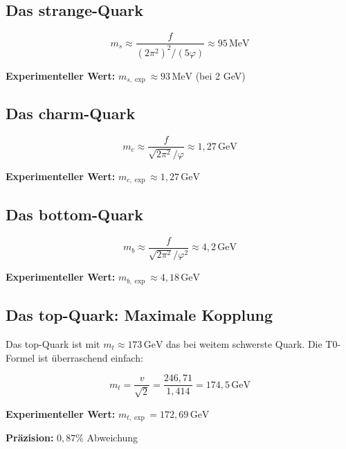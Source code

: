 	\subsection{Das strange-Quark}
	
	\begin{equation}
		\boxed{m_s \approx \frac{f}{(2\pi^2)^2/(5\varphi)} \approx 95\,\text{MeV}}
	\end{equation}
	
	\textbf{Experimenteller Wert:} \(m_{s,\exp} \approx 93\,\text{MeV}\) (bei 2 GeV)
	
	\subsection{Das charm-Quark}
	
	\begin{equation}
		\boxed{m_c \approx \frac{f}{\sqrt{2\pi^2}/\varphi} \approx 1{,}27\,\text{GeV}}
	\end{equation}
	
	\textbf{Experimenteller Wert:} \(m_{c,\exp} \approx 1{,}27\,\text{GeV}\)
	
	\subsection{Das bottom-Quark}
	
	\begin{equation}
		\boxed{m_b \approx \frac{f}{\sqrt{2\pi^2}/\varphi^2} \approx 4{,}2\,\text{GeV}}
	\end{equation}
	
	\textbf{Experimenteller Wert:} \(m_{b,\exp} \approx 4{,}18\,\text{GeV}\)
	
	\subsection{Das top-Quark: Maximale Kopplung}
	
	Das top-Quark ist mit \(m_t \approx 173\,\text{GeV}\) das bei weitem schwerste Quark. Die T0-Formel ist überraschend einfach:
	
	\begin{equation}
		\boxed{m_t = \frac{v}{\sqrt{2}} = \frac{246{,}71}{1{,}414} = 174{,}5\,\text{GeV}}
	\end{equation}
	
	\textbf{Experimenteller Wert:} \(m_{t,\exp} = 172{,}69\,\text{GeV}\)
	
	\textbf{Präzision:} \(0{,}87\%\) Abweichung
	
